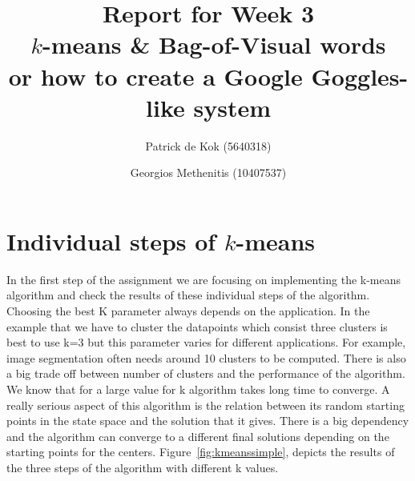 \documentclass[a4paper,10pt,twoside]{article}
\title{Report for Week 3 \\\normalsize $k$-means \& Bag-of-Visual words\\ or how to create a Google Goggles-like system}
\author{Patrick de Kok (5640318) \and Georgios Methenitis (10407537)}
\begin{document}
\maketitle
\thispagestyle{empty}

\section{Individual steps of $k$-means}
In the first step of the assignment we are focusing on implementing the k-means algorithm and check the results of these individual steps of the algorithm. Choosing the best K parameter always depends on the application. In the example that we have to cluster the datapoints which consist three clusters is best to use k=3 but this parameter varies for different applications. For example, image segmentation often needs around 10 clusters to be computed. There is also a big trade off between number of clusters and the performance of the algorithm. We know that for a large value for k algorithm takes long time to converge.
A really serious aspect of this algorithm is the relation between its random starting points in the state space and the solution that it gives. There is a big dependency and the algorithm can converge to a different final solutions depending on the starting points for the centers. Figure~\ref{fig:kmeanssimple}, depicts the results of the three steps of the algorithm with different k values.
\end{document}
